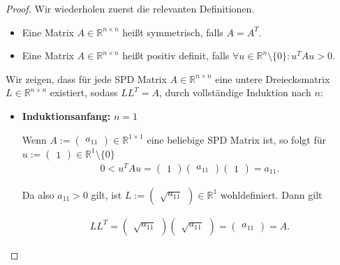 \documentclass[titlepage]{article}
\begin{document}
\begin{proof}
	Wir wiederholen zuerst die relevanten Definitionen.
	
	\begin{itemize}
		\item Eine Matrix $A \in \mathbb{R}^{n\times n}$ heißt symmetrisch, falls $A = A^T$.
		\item Eine Matrix $A \in \mathbb{R}^{n\times n}$ heißt positiv definit, falls $\forall u \in \mathbb{R}^n\setminus\{0\}: u^T A u > 0$.
	\end{itemize}

	Wir zeigen, dass für jede SPD Matrix $A \in \mathbb{R}^{n\times n}$ eine untere Dreiecksmatrix $L \in \mathbb{R}^{n\times n}$ existiert, sodass $LL^T=A$, durch vollständige Induktion nach $n$:
	
	\begin{itemize}
		\item \textbf{Induktionsanfang:} $n=1$
		
		Wenn $A := \begin{pmatrix}
			a_{11}
		\end{pmatrix} \in \mathbb{R}^{1\times 1}$ eine beliebige SPD Matrix ist, so folgt für $u := \begin{pmatrix} 1 \end{pmatrix} \in \mathbb{R}^1 \setminus\{0\}$
		\begin{align*}
			0 < u^TAu = \begin{pmatrix}
				1
			\end{pmatrix} \begin{pmatrix}
				a_{11}
			\end{pmatrix} \begin{pmatrix}
				1
			\end{pmatrix} = a_{11}.
		\end{align*}
	
		Da also $a_{11} > 0$ gilt, ist $L := \begin{pmatrix}
			\sqrt{a_{11}}
		\end{pmatrix} \in \mathbb{R}^{1}$ wohldefiniert. Dann gilt
	
		\begin{align*}
			LL^T = \begin{pmatrix}
				\sqrt{a_{11}}
			\end{pmatrix} \begin{pmatrix}
				\sqrt{a_{11}}
			\end{pmatrix} = \begin{pmatrix}
				a_{11}
			\end{pmatrix} = A.
		\end{align*}
	

\end{itemize}
\end{proof}
\end{document}
